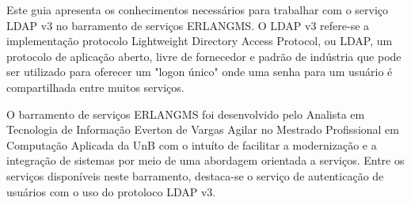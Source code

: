 Este guia apresenta os conhecimentos necessários para trabalhar
com o serviço LDAP v3 no barramento de serviços ERLANGMS. O 
LDAP v3 refere-se a implementação protocolo
Lightweight Directory Access Protocol, ou LDAP,
um protocolo de aplicação aberto, livre de fornecedor e 
padrão de indústria que pode ser utilizado para oferecer
um "logon único" onde uma senha para um usuário é
compartilhada entre muitos serviços.

O barramento de serviços ERLANGMS foi desenvolvido 
pelo Analista em Tecnologia de Informação 
Everton de Vargas Agilar
no Mestrado Profissional em Computação Aplicada da UnB com 
o intuíto de facilitar a modernização e a integração de 
sistemas por meio de uma abordagem orientada a serviços. Entre 
os serviços disponíveis neste barramento, destaca-se
o serviço de autenticação de usuários com o uso do
protoloco LDAP v3.
